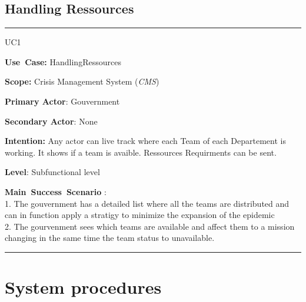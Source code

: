 \subsection{Handling Ressources}
\vspace{0.5cm}
\hrule
\vspace{0.5cm}
\begin{lyxlist}{UC1}
\small{
\item [\textbf{Use~Case:}] HandlingRessources
\item [\textbf{Scope:}] Crisis Management System (\emph{CMS})
\item [\textbf{Primary Actor}:] Gouvernment
\item [\textbf{Secondary Actor}:] None
\item [\textbf{Intention:}]Any actor can live track where each Team of each
Departement is working. It shows if a team is avaible. Ressources Requirments
can be sent.
\item [\textbf{Level}:]Subfunctional level
\item [\textbf{Main~Success~Scenario}]:\\
1. The gouvernment has a detailed list where all the teams are distributed and
can in function apply a stratigy to minimize the expansion of the epidemic\\
2. The gourvenment sees which teams are available and affect them to a
mission changing in the same time the team status to unavailable.\\

}
\end{lyxlist}
\hrule
\vspace{0.5cm} 

\section{System procedures}

